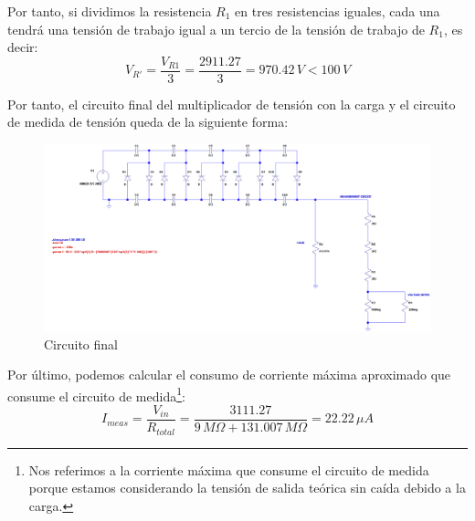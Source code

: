Por tanto, si dividimos la resistencia $R_1$ en tres resistencias iguales, cada una tendrá una 
tensión de trabajo igual a un tercio de la tensión de trabajo de $R_1$, es decir:
\begin{equation}
    V_{R'} = \frac{V_{R1}}{3} = \frac{2911.27}{3} = 970.42\,V < 100\,V
\end{equation}

Por tanto, el circuito final del multiplicador de tensión con la carga y el circuito de medida 
de tensión queda de la siguiente forma:
\begin{figure}[H]
    \centering
    \includegraphics[width=1\textwidth]{img/circ_final.png}
    \caption{Circuito final}
    \label{fig:esquema_final}
\end{figure}

Por último, podemos calcular el consumo de corriente máxima aproximado que consume el circuito de medida\footnote{Nos referimos 
a la corriente máxima que consume el circuito de medida porque estamos considerando la tensión 
de salida teórica sin caída debido a la carga.}:
\begin{equation}
    I_{meas} = \frac{V_{in}}{R_{total}} = \frac{3111.27}{9\,M\Omega+131.007\,M\Omega} = 22.22\,\mu A
\end{equation}